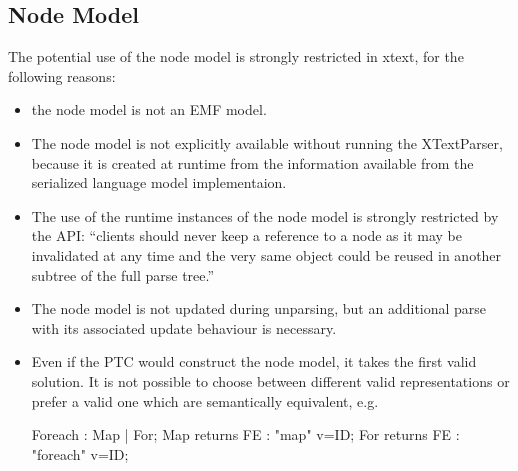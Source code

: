 \subsection{Node Model}
The potential use of the node model is strongly restricted in xtext, for the following reasons:
\begin{itemize}
	\item the node model is not an EMF model. 
	\item The node model is not explicitly available without running the XTextParser, because it is created at runtime from the information available from the serialized language model implementaion. 
	\item The use of the runtime instances of the node model is strongly restricted by the API: ``clients should never keep a reference to a node as it may be invalidated at any time and the very same object could be reused in another subtree of the full parse tree.''
	\item The node model is not updated during unparsing, but an additional parse with its associated update behaviour is necessary.
	\item Even if the PTC would construct the node model, it takes the first valid solution. It is not possible to choose between different valid representations or prefer a valid one which are semantically equivalent, e.g.\begin{xtxt}
Foreach 		: 	Map | For;
Map returns FE  	:  	"map" 		v=ID;
For returns FE  	: 	"foreach"	v=ID;
\end{xtxt}
\end{itemize}